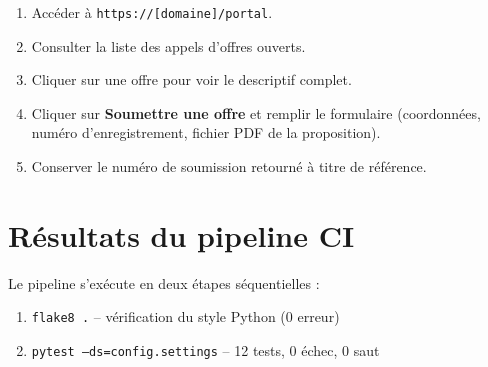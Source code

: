 \begin{enumerate}
    \item Accéder à \texttt{https://[domaine]/portal}.
    \item Consulter la liste des appels d'offres ouverts.
    \item Cliquer sur une offre pour voir le descriptif complet.
    \item Cliquer sur \textbf{Soumettre une offre} et remplir le formulaire
    (coordonnées, numéro d'enregistrement, fichier PDF de la proposition).
    \item Conserver le numéro de soumission retourné à titre de référence.
\end{enumerate}


\chapter{Résultats du pipeline CI}


Le pipeline s'exécute en deux étapes séquentielles :
\begin{enumerate}
    \item \texttt{flake8 .} -- vérification du style Python (0 erreur)
    \item \texttt{pytest --ds=config.settings} -- 12 tests, 0 échec, 0 saut
\end{enumerate}
